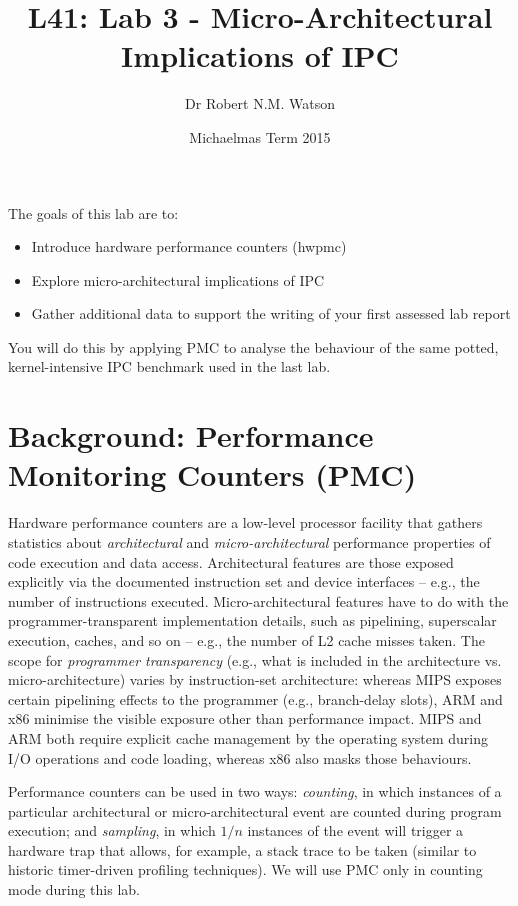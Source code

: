 \documentclass[a4paper,10pt]{article}
\begin{document}
\title{L41: Lab 3 - Micro-Architectural Implications of IPC}
\author{Dr Robert N.M. Watson}
\date{Michaelmas Term 2015}
\maketitle

\noindent
The goals of this lab are to:

\begin{itemize}
\item Introduce hardware performance counters (hwpmc)
\item Explore micro-architectural implications of IPC
\item Gather additional data to support the writing of your first assessed lab
  report
\end{itemize}

\noindent
You will do this by applying PMC to analyse the behaviour of the same potted,
kernel-intensive IPC benchmark used in the last lab.

\section*{Background: Performance Monitoring Counters (PMC)}

Hardware performance counters are a low-level processor facility that gathers
statistics about \textit{architectural} and \textit{micro-architectural}
performance properties of code execution and data access.
Architectural features are those exposed explicitly via the documented
instruction set and device interfaces -- e.g., the number of instructions
executed.
Micro-architectural features have to do with the programmer-transparent
implementation details, such as pipelining, superscalar execution, caches, and
so on -- e.g., the number of L2 cache misses taken.
The scope for \textit{programmer transparency} (e.g., what is included in the
architecture vs. micro-architecture) varies by instruction-set architecture:
whereas MIPS exposes certain pipelining effects to the programmer (e.g.,
branch-delay slots), ARM and x86 minimise the visible exposure other than
performance impact.
MIPS and ARM both require explicit cache management by the operating system
during I/O operations and code loading, whereas x86 also masks those
behaviours.

Performance counters can be used in two ways: \textit{counting}, in which
instances of a particular architectural or micro-architectural event are
counted during program execution; and \textit{sampling}, in which $1/n$
instances of the event will trigger a hardware trap that allows, for example,
a stack trace to be taken (similar to historic timer-driven profiling
techniques).
We will use PMC only in counting mode during this lab.
\end{document}
